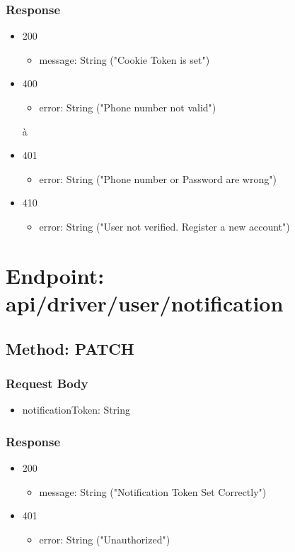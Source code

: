 \subsubsection*{Response}
\begin{itemize}
    \item 200
          \begin{itemize}
              \item message: String ("Cookie Token is set")
          \end{itemize}
    \item 400
          \begin{itemize}
              \item error: String ("Phone number not valid")
          \end{itemize}à
    \item 401
          \begin{itemize}
              \item error: String ("Phone number or Password are wrong")
          \end{itemize}
    \item 410
          \begin{itemize}
              \item error: String ("User not verified. Register a new account")
          \end{itemize}
\end{itemize}

\section*{Endpoint: api/driver/user/notification}
\subsection*{Method: PATCH}
\subsubsection*{Request Body}
\begin{itemize}
    \item notificationToken: String
\end{itemize}
\subsubsection*{Response}
\begin{itemize}
    \item 200
          \begin{itemize}
              \item message: String ("Notification Token Set Correctly")
          \end{itemize}
    \item 401
          \begin{itemize}
              \item error: String ("Unauthorized")
          \end{itemize}
\end{itemize}

